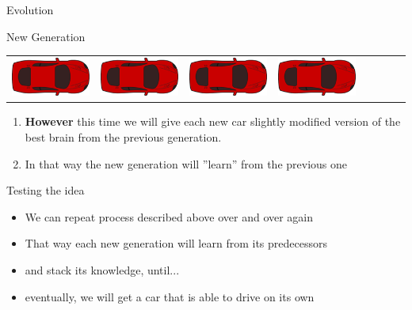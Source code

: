 \documentclass{beamer}
\begin{document}
\begin{frame}{Evolution}
\begin{block}{New Generation}
\begin{tabular}{c|c|c|c|c|c|c|c}
            \includegraphics[scale=0.25]{car.png}&
            \includegraphics[scale=0.25]{car.png}&
            \includegraphics[scale=0.25]{car.png}&
            \includegraphics[scale=0.25]{car.png}

        \end{tabular}
        \begin{enumerate}
            \item \textbf{However} this time we will give each new car slightly modified version of
            the best brain from the previous generation.
            \item In that way the new generation will ”learn” from the previous one
        \end{enumerate}
    \end{block}
    \begin{alertblock}{Testing the idea}
        \footnotesize
            \begin{itemize}
                \item We can repeat process described above over and over again
                \item That way each new generation will learn from its predecessors
                \item and stack its knowledge, until...
                \item eventually, we will get a car that is able to drive on its own
            \end{itemize}
    \end{alertblock}
  

\end{frame}
\end{document}
